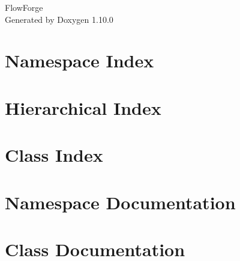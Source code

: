 \documentclass[twoside]{book}
\newcommand{\+}{\discretionary{\mbox{\scriptsize$\hookleftarrow$}}{}{}}
\newcommand{\clearemptydoublepage}{%
    \newpage{\pagestyle{empty}\cleardoublepage}%
  }
\begin{document}
  \raggedbottom
    \hypersetup{pageanchor=false,
                bookmarksnumbered=true,
                pdfencoding=unicode
               }
  \begin{titlepage}
  \vspace*{7cm}
  \begin{center}%
  {\Large Flow\+Forge}\\
  \vspace*{1cm}
  {\large Generated by Doxygen 1.10.0}\\
  \end{center}
  \end{titlepage}
  \clearemptydoublepage
  \tableofcontents
  \clearemptydoublepage
  \hypersetup{pageanchor=true}
\chapter{Namespace Index}

\chapter{Hierarchical Index}

\chapter{Class Index}

\chapter{Namespace Documentation}

\chapter{Class Documentation}







  \backmatter
  \newpage
  \clearemptydoublepage
  \printindex
\end{document}
